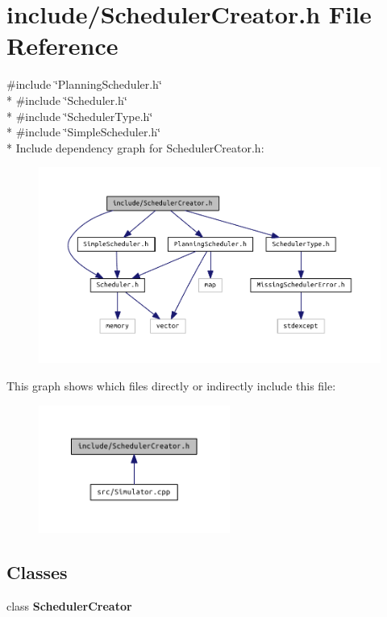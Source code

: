 \section{include/\+Scheduler\+Creator.h File Reference}
\label{_scheduler_creator_8h}
{\ttfamily \#include \char`\"{}Planning\+Scheduler.\+h\char`\"{}}\\*
{\ttfamily \#include \char`\"{}Scheduler.\+h\char`\"{}}\\*
{\ttfamily \#include \char`\"{}Scheduler\+Type.\+h\char`\"{}}\\*
{\ttfamily \#include \char`\"{}Simple\+Scheduler.\+h\char`\"{}}\\*
Include dependency graph for Scheduler\+Creator.\+h\+:
\nopagebreak
\begin{figure}[H]
\begin{center}
\leavevmode
\includegraphics[width=350pt]{_scheduler_creator_8h__incl}
\end{center}
\end{figure}
This graph shows which files directly or indirectly include this file\+:
\nopagebreak
\begin{figure}[H]
\begin{center}
\leavevmode
\includegraphics[width=178pt]{_scheduler_creator_8h__dep__incl}
\end{center}
\end{figure}
\subsection*{Classes}
\begin{DoxyCompactItemize}
\item 
class {\bf Scheduler\+Creator}
\end{DoxyCompactItemize}
